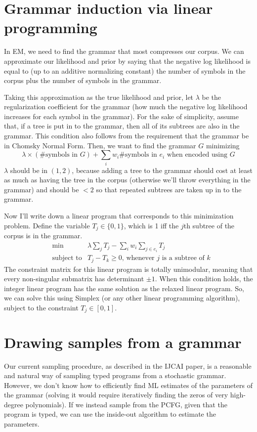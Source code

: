 \documentclass[12pt]{article}
\begin{document}
\section{Grammar induction via linear programming}
In EM, we need to find the grammar that most compresses our corpus.
We can approximate our likelihood and prior by saying that the negative log likelihood is equal to (up to an additive normalizing constant) the number of symbols in the corpus plus the number of symbols in the grammar.

Taking this approximation as the true likelihood and prior, let $\lambda$ be the regularization coefficient for the grammar (how much the negative log likelihood increases for each symbol in the grammar).
For the sake of simplicity, assume that, if a tree is put in to the grammar, then all of its subtrees are also in the grammar.
This condition also follows from the requirement that the grammar be in Chomsky Normal Form.
Then, we want to find the grammar $G$ minimizing
$$
\lambda \times \left( \mbox{\# symbols in $G$}\right)+\sum_i w_i \mbox{\# symbols in $e_i$ when encoded using $G$}
$$
$\lambda$ should be in $(1,2)$, because adding a tree to the grammar should cost at least as much as having the tree in the corpus (otherwise we'll throw everything in the grammar) and should be $< 2$ so that repeated subtrees are taken up in to the grammar.

Now I'll write down a linear program that corresponds to this minimization problem.
Define the variable $T_j\in \{0,1\}$, which is 1 iff the $j$th subtree of the corpus is in the grammar.
\begin{eqnarray*}
&\min& \lambda \sum_j T_j - \sum_i w_i \sum_{j\in e_i} T_j\\
&\mbox{subject to}& T_j - T_k \geq 0\mbox{, whenever $j$ is a subtree of $k$}
\end{eqnarray*}
The constraint matrix for this linear program is totally unimodular, meaning that every non-singular submatrix has determinant $\pm 1$.
When this condition holds, the integer linear program has the same solution as the relaxed linear program.
So, we can solve this using Simplex (or any other linear programming algorithm), subject to the constraint $T_j\in [0,1]$.
\section{Drawing samples from a grammar}
Our current sampling procedure, as described in the IJCAI paper, is a reasonable and natural way of sampling typed programs from a stochastic grammar.
However, we don't know how to efficiently find ML estimates of the parameters of the grammar (solving it would require iteratively finding the zeros of very high-degree polynomials).
If we instead sample from the PCFG, given that the program is typed, we can use the inside-out algorithm to estimate the parameters.
\end{document}
